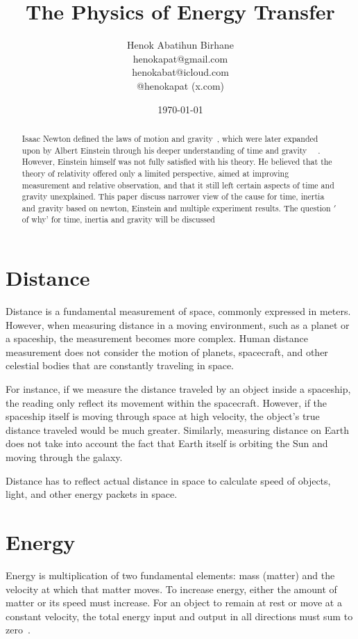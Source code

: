 \documentclass{article}
\title{The Physics of Energy Transfer}
\author{Henok Abatihun Birhane \\
	henokapat@gmail.com \\
	henokabat@icloud.com \\
	@henokapat (x.com)}
\date{\today}
\begin{document}
    \maketitle


    \begin{abstract}
        Isaac Newton defined the laws of motion and gravity~\cite{newton1687principia}, which were later expanded upon by Albert Einstein through his deeper understanding of time and gravity~\cite{einstein1905electrodynamics} ~\cite{einstein1916foundation}.
         However, Einstein himself was not fully satisfied with his theory.
         He believed that the theory of relativity offered only a limited perspective, aimed at improving measurement and relative observation, and that it still left certain aspects of time and gravity unexplained.
         This paper discuss narrower view of the cause for time, inertia and gravity based on newton, Einstein and multiple experiment results.
         The question \('\)of why' for time, inertia and gravity will be discussed
    \end{abstract}

    \newpage
    \section{Distance}\label{sec:distance}
    Distance is a fundamental measurement of space, commonly expressed in meters.
    However, when measuring distance in a moving environment, such as a planet or a spaceship, the measurement becomes more complex.
    Human distance measurement does not consider the motion of planets, spacecraft, and other celestial bodies that are constantly traveling in space.

    For instance, if we measure the distance traveled by an object inside a spaceship, the reading only reflect its movement within the spacecraft.
    However, if the spaceship itself is moving through space at high velocity, the object’s true distance traveled would be much greater.
    Similarly, measuring distance on Earth does not take into account the fact that Earth itself is orbiting the Sun and moving through the galaxy.

    Distance has to reflect actual distance in space to calculate speed of objects, light, and other energy packets in space.

    \section{Energy}\label{sec:energy}
    Energy is multiplication of two fundamental elements: mass (matter) and the velocity at which that matter moves.
    To increase energy, either the amount of matter or its speed must increase.
    For an object to remain at rest or move at a constant velocity, the total energy input and output in all directions must sum to zero~\cite{newton1687principia}.
\end{document}
